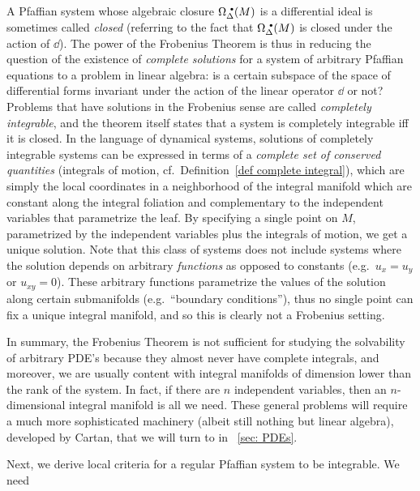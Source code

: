 \begin{rem}\label{rem: complete integrability}
    A Pfaffian system whose algebraic closure $\Omega^{\smbullet}_\Delta(M)$ is a differential ideal is sometimes called \emph{closed} (referring to the fact that $\Omega^{\smbullet}_\Delta(M)$ is closed under the action of $\dd$).
    The power of the Frobenius Theorem is thus in reducing the question of the existence of \emph{complete solutions} for a system of arbitrary Pfaffian equations to a problem in linear algebra: is a certain subspace of the space of differential forms invariant under the action of the linear operator $\dd$ or not? Problems that have solutions in the Frobenius sense are called \emph{completely integrable}, and the theorem itself states that a system is completely integrable iff it is closed. In the language of dynamical systems, solutions of completely integrable systems can be expressed in terms of a \emph{complete set of conserved quantities} (integrals of motion, cf.\ Definition~\ref{def complete integral}), which are simply the local coordinates in a neighborhood of the integral manifold which are constant along the integral foliation and complementary to the independent variables that parametrize the leaf. By specifying a single point on $M$, parametrized by the independent variables plus the integrals of motion, we get a unique solution. Note that this class of systems does not include systems where the solution depends on arbitrary \emph{functions} as opposed to constants (e.g.\ $u_x=u_y$ or $u_{xy}=0$). These arbitrary functions parametrize the values of the solution along certain submanifolds (e.g.~``boundary conditions''), thus no single point can fix a unique integral manifold, and so this is clearly not a Frobenius setting.
    
    In summary, the Frobenius Theorem is not sufficient for studying the solvability of arbitrary PDE's because they almost never have complete integrals, and moreover, we are usually content with integral manifolds of dimension lower than the rank of the system. In fact, if there are $n$ independent variables, then an $n$-dimensional integral manifold is all we need. These general problems will require a much more sophisticated machinery (albeit still nothing but linear algebra), developed by Cartan, that we will turn to in \sect~\ref{sec: PDEs}.
\end{rem}

Next, we derive local criteria for a regular Pfaffian system to be integrable. We need

